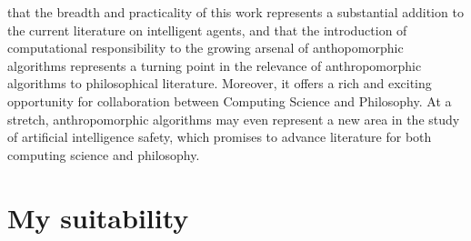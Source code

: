  that the breadth and practicality of this work represents a substantial addition to the current literature on intelligent agents, and that the introduction of computational responsibility to the growing arsenal of anthopomorphic algorithms represents a turning point in the relevance of anthropomorphic algorithms to philosophical literature. Moreover, it offers a rich and exciting opportunity for collaboration between Computing Science and Philosophy. At a stretch, anthropomorphic algorithms may even represent a new area in the study of artificial intelligence safety, which promises to advance literature for both computing science and philosophy.

\section{My suitability}






